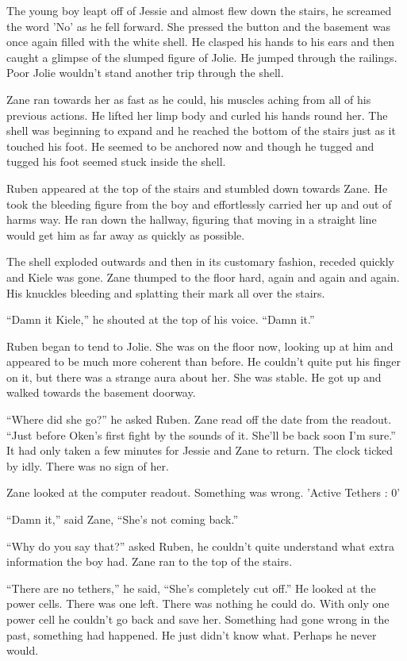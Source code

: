 The young boy leapt off of Jessie and almost flew down the stairs, he screamed the word 'No' as he fell forward.  She pressed the button and the basement was once again filled with the white shell.  He clasped his hands to his ears and then caught a glimpse of the slumped figure of Jolie.  He jumped through the railings.  Poor Jolie wouldn't stand another trip through the shell.  

Zane ran towards her as fast as he could, his muscles aching from all of his previous actions.  He lifted her limp body and curled his hands round her.  The shell was beginning to expand and he reached the bottom of the stairs just as it touched his foot.  He seemed to be anchored now and though he tugged and tugged his foot seemed stuck inside the shell.

Ruben appeared at the top of the stairs and stumbled down towards Zane.  He took the bleeding figure from the boy and effortlessly carried her up and out of harms way.  He ran down the hallway, figuring that moving in a straight line would get him as far away as quickly as possible.  

The shell exploded outwards and then in its customary fashion, receded quickly and Kiele was gone.  Zane thumped to the floor hard, again and again and again.  His knuckles bleeding and splatting their mark all over the stairs.  

``Damn it Kiele,'' he shouted at the top of his voice.  ``Damn it.''

Ruben began to tend to Jolie.  She was on the floor now, looking up at him and appeared to be much more coherent than before.  He couldn't quite put his finger on it, but there was a strange aura about her.  She was stable.  He got up and walked towards the basement doorway.  

``Where did she go?'' he asked Ruben.  Zane read off the date from the readout.  ``Just before Oken's first fight by the sounds of it.  She'll be back soon I'm sure.''  It had only taken a few minutes for Jessie and Zane to return.  The clock ticked by idly.  There was no sign of her.

Zane looked at the computer readout.  Something was wrong.  'Active Tethers : 0'

``Damn it,'' said Zane, ``She's not coming back.''

``Why do you say that?'' asked Ruben, he couldn't quite understand what extra information the boy had.  Zane ran to the top of the stairs.

``There are no tethers,'' he said, ``She's completely cut off.''  He looked at the power cells.  There was one left.  There was nothing he could do.  With only one power cell he couldn't go back and save her.  Something had gone wrong in the past, something had happened.  He just didn't know what.  Perhaps he never would.

